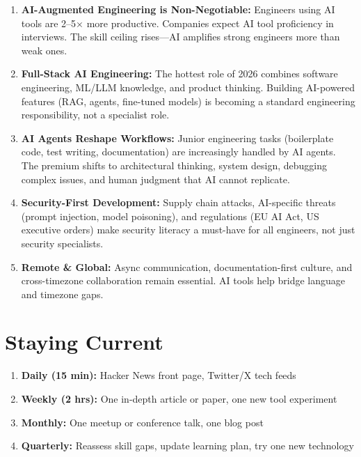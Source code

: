 \documentclass[11pt, a4paper, oneside]{report}
\begin{document}
{{{{{{{{{{{{\begin{enumerate}[leftmargin=*]
\item \textbf{AI-Augmented Engineering is Non-Negotiable:} Engineers using AI tools are 2--5$\times$ more productive. Companies expect AI tool proficiency in interviews. The skill ceiling rises---AI amplifies strong engineers more than weak ones.
\item \textbf{Full-Stack AI Engineering:} The hottest role of 2026 combines software engineering, ML/LLM knowledge, and product thinking. Building AI-powered features (RAG, agents, fine-tuned models) is becoming a standard engineering responsibility, not a specialist role.
\item \textbf{AI Agents Reshape Workflows:} Junior engineering tasks (boilerplate code, test writing, documentation) are increasingly handled by AI agents. The premium shifts to architectural thinking, system design, debugging complex issues, and human judgment that AI cannot replicate.
\item \textbf{Security-First Development:} Supply chain attacks, AI-specific threats (prompt injection, model poisoning), and regulations (EU AI Act, US executive orders) make security literacy a must-have for all engineers, not just security specialists.
\item \textbf{Remote \& Global:} Async communication, documentation-first culture, and cross-timezone collaboration remain essential. AI tools help bridge language and timezone gaps.
\end{enumerate}

\section[Staying Current]{Staying Current}

\begin{enumerate}[leftmargin=*]
\item \textbf{Daily (15 min):} Hacker News front page, Twitter/X tech feeds
\item \textbf{Weekly (2 hrs):} One in-depth article or paper, one new tool experiment
\item \textbf{Monthly:} One meetup or conference talk, one blog post
\item \textbf{Quarterly:} Reassess skill gaps, update learning plan, try one new technology
\end{enumerate}


}}}}}}}}}}}}
\end{document}
